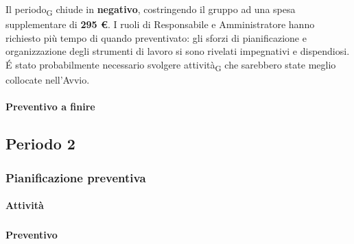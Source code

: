 Il periodo\textsubscript{G} chiude in \textbf{negativo}, costringendo il gruppo ad una spesa supplementare di \textbf{295 \euro}. I ruoli di Responsabile e Amministratore hanno richiesto più tempo di quando preventivato: gli sforzi di pianificazione e organizzazione degli strumenti di lavoro si sono rivelati impegnativi e dispendiosi. \'E stato probabilmente necessario svolgere attività\textsubscript{G} che sarebbero state meglio collocate nell'Avvio.



\paragraph{Preventivo a finire}
\subparagraph*{}

\pafTable{
	
}

\pagebreak
\subsection{Periodo 2}

\subsubsection{Pianificazione preventiva}

\paragraph{Attività}
\subparagraph*{}

\planningTable{
	
}



\paragraph{Preventivo}
\subparagraph*{}


